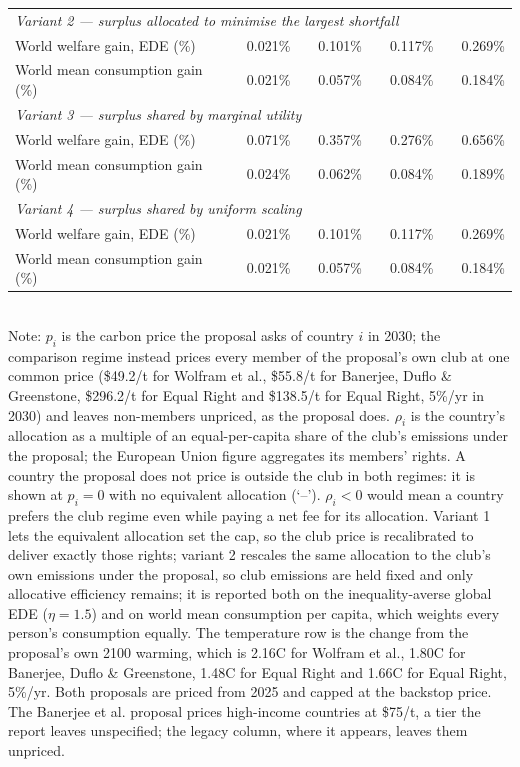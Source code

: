 \begin{table}[htbp]
\begin{tabular}{lcccccccc}
  \midrule
  \multicolumn{9}{l}{\textit{Variant 2 --- surplus allocated to minimise the largest shortfall}} \\
  \quad World welfare gain, EDE (\%) &  & 0.021\% &  & 0.101\% &  & 0.117\% &  & 0.269\% \\
  \quad World mean consumption gain (\%) &  & 0.021\% &  & 0.057\% &  & 0.084\% &  & 0.184\% \\
  \midrule
  \multicolumn{9}{l}{\textit{Variant 3 --- surplus shared by marginal utility}} \\
  \quad World welfare gain, EDE (\%) &  & 0.071\% &  & 0.357\% &  & 0.276\% &  & 0.656\% \\
  \quad World mean consumption gain (\%) &  & 0.024\% &  & 0.062\% &  & 0.084\% &  & 0.189\% \\
  \midrule
  \multicolumn{9}{l}{\textit{Variant 4 --- surplus shared by uniform scaling}} \\
  \quad World welfare gain, EDE (\%) &  & 0.021\% &  & 0.101\% &  & 0.117\% &  & 0.269\% \\
  \quad World mean consumption gain (\%) &  & 0.021\% &  & 0.057\% &  & 0.084\% &  & 0.184\% \\
  \bottomrule
\end{tabular}
\label{tab:equiv_rights_A}
\\[4pt]
{\footnotesize Note: $p_i$ is the carbon price the proposal asks of country $i$ in 2030; the comparison regime instead prices every member of the proposal's own club at one common price (\$49.2/t for Wolfram et al., \$55.8/t for Banerjee, Duflo \& Greenstone, \$296.2/t for Equal Right and \$138.5/t for Equal Right, 5\%/yr in 2030) and leaves non-members unpriced, as the proposal does. $\rho_i$ is the country's allocation as a multiple of an equal-per-capita share of the club's emissions under the proposal; the European Union figure aggregates its members' rights. A country the proposal does not price is outside the club in both regimes: it is shown at $p_i=0$ with no equivalent allocation (`--'). $\rho_i < 0$ would mean a country prefers the club regime even while paying a net fee for its allocation. Variant 1 lets the equivalent allocation set the cap, so the club price is recalibrated to deliver exactly those rights; variant 2 rescales the same allocation to the club's own emissions under the proposal, so club emissions are held fixed and only allocative efficiency remains; it is reported both on the inequality-averse global EDE ($\eta=1.5$) and on world mean consumption per capita, which weights every person's consumption equally. The temperature row is the change from the proposal's own 2100 warming, which is 2.16\textdegree{}C for Wolfram et al., 1.80\textdegree{}C for Banerjee, Duflo \& Greenstone, 1.48\textdegree{}C for Equal Right and 1.66\textdegree{}C for Equal Right, 5\%/yr. Both proposals are priced from 2025 and capped at the backstop price. The Banerjee et al. proposal prices high-income countries at \$75/t, a tier the report leaves unspecified; the legacy column, where it appears, leaves them unpriced.}
\end{table}
